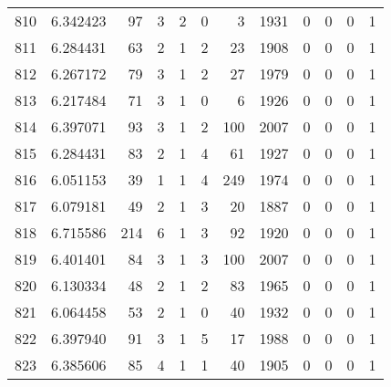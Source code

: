 \begin{tabular}{lrrrrrrrrrrr}
810 &  6.342423 &   97 &      3 &        2 &      0 &               3 &  1931 &               0 &               0 &               0 &               1 \\
811 &  6.284431 &   63 &      2 &        1 &      2 &              23 &  1908 &               0 &               0 &               0 &               1 \\
812 &  6.267172 &   79 &      3 &        1 &      2 &              27 &  1979 &               0 &               0 &               0 &               1 \\
813 &  6.217484 &   71 &      3 &        1 &      0 &               6 &  1926 &               0 &               0 &               0 &               1 \\
814 &  6.397071 &   93 &      3 &        1 &      2 &             100 &  2007 &               0 &               0 &               0 &               1 \\
815 &  6.284431 &   83 &      2 &        1 &      4 &              61 &  1927 &               0 &               0 &               0 &               1 \\
816 &  6.051153 &   39 &      1 &        1 &      4 &             249 &  1974 &               0 &               0 &               0 &               1 \\
817 &  6.079181 &   49 &      2 &        1 &      3 &              20 &  1887 &               0 &               0 &               0 &               1 \\
818 &  6.715586 &  214 &      6 &        1 &      3 &              92 &  1920 &               0 &               0 &               0 &               1 \\
819 &  6.401401 &   84 &      3 &        1 &      3 &             100 &  2007 &               0 &               0 &               0 &               1 \\
820 &  6.130334 &   48 &      2 &        1 &      2 &              83 &  1965 &               0 &               0 &               0 &               1 \\
821 &  6.064458 &   53 &      2 &        1 &      0 &              40 &  1932 &               0 &               0 &               0 &               1 \\
822 &  6.397940 &   91 &      3 &        1 &      5 &              17 &  1988 &               0 &               0 &               0 &               1 \\
823 &  6.385606 &   85 &      4 &        1 &      1 &              40 &  1905 &               0 &               0 &               0 &               1 \\

\end{tabular}
